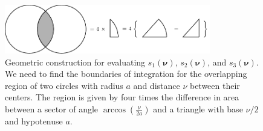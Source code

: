 \documentclass[11pt]{article}
\providecommand{\bs}[1]{\boldsymbol{#1}}
\begin{document}
\begin{figure}[h]
 \captionsetup{width=1.0\linewidth}
 \centering
   \centering
   \includegraphics[width = 0.8\textwidth]{../figures/geometry/geometry.pdf}
   \caption{Geometric construction for evaluating $s_1(\bs{\nu})$,
     $s_2(\bs{\nu})$, and $s_3(\bs{\nu})$. We need to find the boundaries of
     integration for the overlapping region of two circles with radius $a$ and
     distance $\nu$ between their centers. The region is given by four times the
     difference in area between a sector of angle
     $\arccos\left(\frac{\nu}{2a}\right)$ and a triangle with base $\nu/2$ and
     hypotenuse $a$.}
   \label{fig:geometry}
\end{figure}
\end{document}

